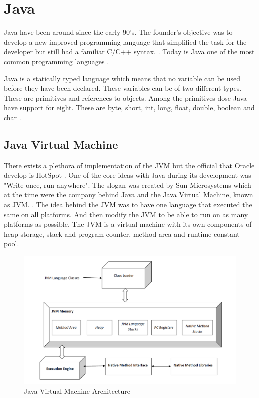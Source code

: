 \section{Java}
\label{JavaInstrumentation}
Java have been around since the early 90's. The founder's objective was to develop a new improved programming language that simplified the task for the developer but still had a familiar C/C++ syntax. \parencite{OracleVoice}. Today is Java one of the most common programming languages \parencite{octoverse}.

Java is a statically typed language which means that no variable can be used before they have been declared. These variables can be of two different types. These are primitives and references to objects. Among the primitives dose Java have support for eight. These are byte, short, int, long, float, double, boolean and char \parencite{primjav}.


\subsection{Java Virtual Machine}
There exists a plethora of implementation of the JVM but the official that Oracle develop is HotSpot \parencite{hotSpot}. One of the core ideas with Java during its development was "Write once, run anywhere". The slogan was created by Sun Microsystems which at the time were the company behind Java and the Java Virtual Machine, known as JVM. \parencite{Craig_2006}. The idea behind the JVM was to have one language that executed the same on all platforms. And then modify the JVM to be able to run on as many platforms as possible. The JVM is a virtual machine with its own components of heap storage, stack and program counter, method area and runtime constant pool.

\begin{figure}
	\centering
	\includegraphics[width=\textwidth]{images/JvmSpec7.png}
	\caption{Java Virtual Machine Architecture}
	\label{fig:JVM}
\end{figure}

